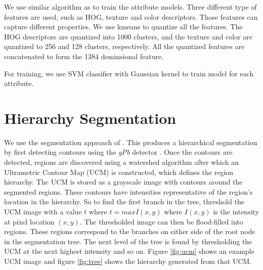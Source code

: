 \documentclass[10pt,twocolumn,letterpaper]{article}
\begin{document}
We use similar algorithm as \cite{farhadi09} to train the attribute models. Three different type of features are used, such as HOG, texture and color descriptors\cite{farhadi09}. Those features can capture different properties. We use kmeans to quantize all the features. The HOG descriptors are quantized into 1000 clusters, and the texture and color are quantized to 256 and 128 clusters, respectively. All the quantized features are concatenated to form the 1384 deminsional feature.

For training, we use SVM classifier with Gaussian kernel to train
model for each attribute.




\section{Hierarchy Segmentation}
\label{sec:segmentation}

We use the segmentation approach of \cite{arbelaez09}.  This
produces a hierarchical segmentation by first detecting contours
using the \emph{gPb} detector \cite{maire08}.  Once the contours are
detected, regions are discovered using a watershed algorithm after
which an Ultrametric Contour Map (UCM) is constructed, which defines
the region hierarchy.  The UCM is stored as a grayscale image with
contours around the segmented regions.  These contours have intensities
representative of the region's location in the hierarchy.  So to find
the first branch in the tree, threshold the UCM image with a value
$t$ where $t = max{I(x,y)}$ where $I(x,y)$ is the intensity at pixel
location $(x,y)$.  The thresholded image can then be flood-filled into
regions.  These regions correspond to the branches on either side of
the root node in the segmentation tree.  The next level of the tree is
found by thresholding the UCM at the next highest intensity and so on.
Figure \ref{fig:ucm} shows an example UCM image and figure \ref{fig:tree}
shows the hierarchy generated from that UCM.
\end{document}
